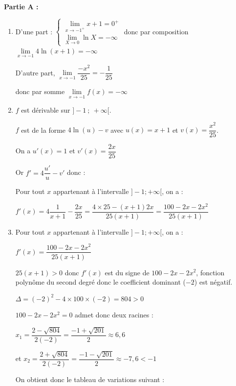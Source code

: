 \medskip

\textbf{Partie A : }

\begin{enumerate}
\item D'une part :  $\begin{cases}
\lim\limits_{x \to -1^+} x+1 = 0^+ \\
\lim\limits_{X \to 0} \ln X = -\infty
\end{cases}$ donc par composition $\lim\limits_{x \to -1} 4\ln (x+1) =-\infty$ 

D'autre part, $\lim\limits_{x \to -1}\dfrac{-x^2}{25}= -\dfrac{1}{25}$ 

donc par somme $\lim\limits_{x \to -1}f(x) = -\infty$



\item $f$ est dérivable sur $]-1~;~+\infty[$.

$f$ est de la forme $4\ln(u) - v$ avec $u(x) = x + 1$ et $v(x) = \dfrac {x^2}{25}$.

On a  $u'(x) =1$ et $v'(x)= \dfrac{2x}{25}$

Or $f'= 4 \dfrac{u'}{u}-v'$ donc :

Pour tout $x$ appartenant à l'intervalle $]-1 ;+\infty[$, on a :

$f'(x) = 4 \dfrac{1}{x+1}- \dfrac{2x}{25}= \dfrac{4 \times 25 -(x+1)2x}{25(x+1)}= \dfrac{100-2 x-2 x^{2}}{25(x+1)}
$
\item Pour tout $x$ appartenant à l'intervalle $]-1 ;+\infty[$, on a :

$f'(x) = \dfrac{100-2 x-2 x^{2}}{25(x+1)}$ 

$25(x+1)>0$ donc $f'(x)$ est du signe de $100 - 2x - 2x^2$, fonction polynôme du second degré donc le coefficient dominant ($-2$) est négatif.

$\Delta = (-2)^2-4 \times 100 \times (-2)= 804 > 0$

$100-2x-2x^2=0$ admet donc deux racines :

$x_1 = \dfrac{2-\sqrt{804}}{2(-2)}= \dfrac{-1+\sqrt{201}}{2} \approx 6,6$

et $x_2 = \dfrac{2+\sqrt{804}}{2(-2)}= \dfrac{-1-\sqrt{201}}{2} \approx -7,6 <-1$

On obtient donc le tableau de variations suivant :

\hfill~	~\hfill~


\end{enumerate}
